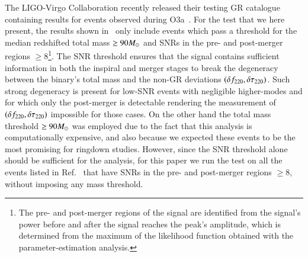 
The LIGO-Virgo Collaboration recently released their testing GR
catalogue containing results for events observed
during O3a~\cite{Abbott:2020jks}. For the test that we here present, the results shown in~\cite{Abbott:2020jks} only include events which pass a threshold for the median redshifted total mass $\geq 90 M_{\odot}$ and SNRs in the pre- and
post-merger regions $\geq 8$\footnote{The pre- and post-merger regions of the signal are identified from the signal's power before and after the signal reaches the peak's amplitude, which is determined from the maximum of the likelihood function obtained with the parameter-estimation analysis.}. 
%
The SNR threshold ensures that the signal contains sufficient information in both the inspiral and merger stages to break the degeneracy between the binary's total mass and the non-GR deviations $(\delta f_{\text{220}}, \delta \tau_{\text{220}})$. Such strong degeneracy is present for low-SNR events with negligible higher-modes and for which only the post-merger is detectable rendering the measurement of $(\delta f_{\text{220}}, \delta \tau_{\text{220}})$ impossible for those cases.
On the other hand the total mass threshold $\geq 90 M_{\odot}$ was employed due to the fact that this analysis is computationally expensive, and also because we expected these events to be the most promising for ringdown studies. However, since the SNR threshold alone should be sufficient for the analysis, for this paper we run the test on all the events listed in Ref.~\cite{Abbott:2020jks} that have SNRs in the pre- and post-merger regions $\geq 8$, without imposing any mass threshold.

